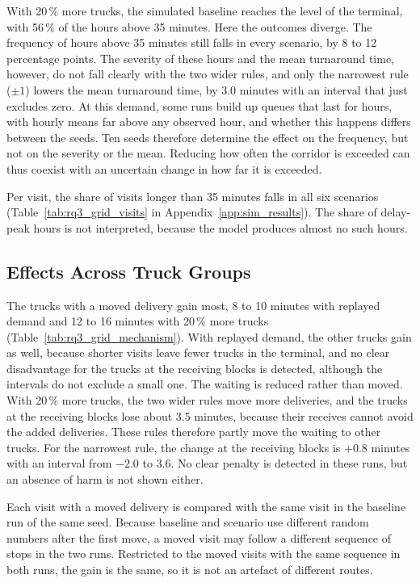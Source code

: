 With 20\,\% more trucks, the simulated baseline reaches the level of the terminal,
with 56\,\% of the hours above 35 minutes. Here the outcomes diverge. The frequency of
hours above 35 minutes still falls in every scenario, by 8 to 12 percentage points.
The severity of these hours and the mean turnaround time, however, do not fall
clearly with the two wider rules, and only the narrowest rule ($\pm 1$) lowers the
mean turnaround time, by 3.0 minutes with an interval that just excludes zero. At this
demand, some runs build up queues that last for hours, with hourly means far above
any observed hour, and whether this happens differs between the seeds. Ten seeds
therefore determine the effect on the frequency, but not on the severity or the
mean. Reducing how often the corridor is exceeded can thus coexist with an uncertain
change in how far it is exceeded.

Per visit, the share of visits longer than 35 minutes falls in all six scenarios
(Table~\ref{tab:rq3_grid_visits} in Appendix~\ref{app:sim_results}). The share of
delay-peak hours is not interpreted, because the model produces almost no such
hours.

\subsection{Effects Across Truck Groups}
\label{sec:res_s1_mechanism}



The trucks with a moved delivery gain most, 8 to 10 minutes with replayed demand and
12 to 16 minutes with 20\,\% more trucks (Table~\ref{tab:rq3_grid_mechanism}). With
replayed demand, the other trucks gain as well, because shorter visits leave fewer
trucks in the terminal, and no clear disadvantage for the trucks at the receiving
blocks is detected, although the intervals do not exclude a small one. The waiting is
reduced rather than moved. With 20\,\% more trucks, the two wider rules move more
deliveries, and the trucks at the receiving blocks lose about 3.5 minutes, because
their receives cannot avoid the added deliveries. These rules therefore partly move
the waiting to other trucks. For the narrowest rule, the change at the receiving
blocks is $+0.8$ minutes with an interval from $-2.0$ to $3.6$. No clear penalty is
detected in these runs, but an absence of harm is not shown either.

Each visit with a moved delivery is compared with the same visit in the baseline run
of the same seed. Because
baseline and scenario use different random numbers after the first move, a moved
visit may follow a different sequence of stops in the two runs. Restricted to the
moved visits with the same sequence in both runs, the gain is the same, so it is not
an artefact of different routes.

